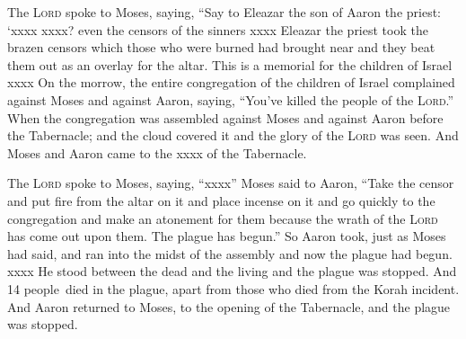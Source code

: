 
\begin{inparaenum}
     The \textsc{Lord} spoke to Moses, saying,%
     ``Say to Eleazar the son of Aaron the priest: `xxxx%
     xxxx? even the censors of the sinners xxxx%
     Eleazar the priest took the brazen censors which those who were burned had brought near and they beat them out as an overlay for the altar.%
     This is a memorial for the children of Israel xxxx%
     On the morrow, the entire congregation of the children of Israel complained against Moses and against Aaron, saying, ``You've killed the people of the \textsc{Lord}.''%
     When the congregation was assembled against Moses and against Aaron before the Tabernacle; and the cloud covered it and the glory of the \textsc{Lord} was seen.%
     And Moses and Aaron came to the xxxx of the Tabernacle.%
    
     The \textsc{Lord} spoke to Moses, saying,%
     ``xxxx''%
     Moses said to Aaron, ``Take the censor and put fire from the altar on it and place incense on it and go quickly to the congregation and make an atonement for them because the wrath of the \textsc{Lord} has come out upon them. The plague has begun.''%
     So Aaron took, just as Moses had said, and ran into the midst of the assembly and now the plague had begun. xxxx%
     He stood between the dead and the living and the plague was stopped.%
     And 14 people\understood\ died in the plague, apart from those who died from the Korah incident.%
     And Aaron returned to Moses, to the opening of the Tabernacle, and the plague was stopped.%
    

\end{inparaenum}
